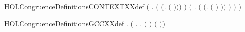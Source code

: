 \begin{SaveVerbatim}{HOLCongruenceDefinitionsCONTEXTXXdef}
                 \ensuremath{(}\HOLSymConst{\HOLTokenExists{}} . \ensuremath{(} \HOLSymConst{\ensuremath{=}} \ensuremath{(}\HOLTokenLambda{}.   \ensuremath{(} \ensuremath{)}\ensuremath{)}\ensuremath{)} \HOLSymConst{\HOLTokenConj{}}  \ensuremath{)} \HOLSymConst{\HOLTokenDisj{}}
                 \ensuremath{(}\HOLSymConst{\HOLTokenExists{}} .
                      \ensuremath{(} \HOLSymConst{\ensuremath{=}} \ensuremath{(}\HOLTokenLambda{}.  \ensuremath{(} \ensuremath{)} \ensuremath{)}\ensuremath{)} \HOLSymConst{\HOLTokenConj{}}  \ensuremath{)} \HOLSymConst{\HOLTokenImp{}}
                  \ensuremath{)} \HOLSymConst{\HOLTokenImp{}}
             \ensuremath{)}
\end{SaveVerbatim}
\newcommand{\HOLCongruenceDefinitionsCONTEXTXXdef}{\UseVerbatim{HOLCongruenceDefinitionsCONTEXTXXdef}}
\begin{SaveVerbatim}{HOLCongruenceDefinitionsGCCXXdef}
\HOLTokenTurnstile{} \HOLSymConst{\HOLTokenForall{}}.   \HOLSymConst{\ensuremath{=}} \ensuremath{(}\HOLTokenLambda{} . \HOLSymConst{\HOLTokenForall{}}.   \HOLSymConst{\HOLTokenImp{}}  \ensuremath{(} \ensuremath{)} \ensuremath{(} \ensuremath{)}\ensuremath{)}
\end{SaveVerbatim}
\newcommand{\HOLCongruenceDefinitionsGCCXXdef}{\UseVerbatim{HOLCongruenceDefinitionsGCCXXdef}}

